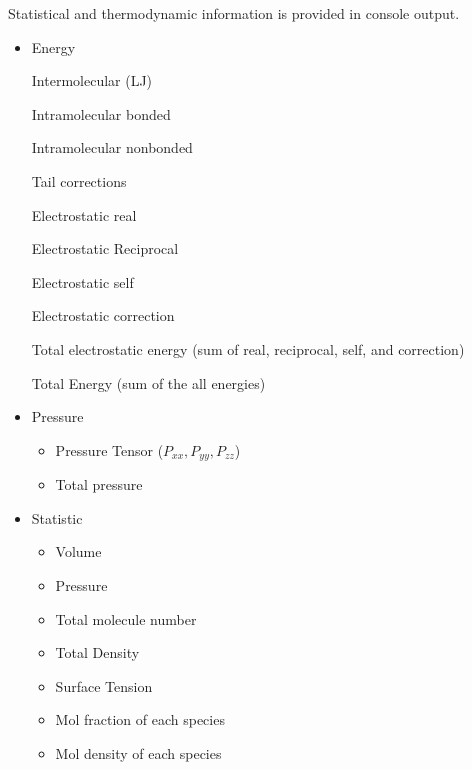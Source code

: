 \documentclass[letterpaper,10pt,english]{sphinxmanual}
\begin{document}
\sphinxAtStartPar
Statistical and thermodynamic information is provided in console output.
\begin{itemize}
\item {} 
\sphinxAtStartPar
Energy

\sphinxAtStartPar
\textendash{} Intermolecular (LJ)

\sphinxAtStartPar
\textendash{} Intramolecular bonded

\sphinxAtStartPar
\textendash{} Intramolecular nonbonded

\sphinxAtStartPar
\textendash{} Tail corrections

\sphinxAtStartPar
\textendash{} Electrostatic real

\sphinxAtStartPar
\textendash{} Electrostatic Reciprocal

\sphinxAtStartPar
\textendash{} Electrostatic self

\sphinxAtStartPar
\textendash{} Electrostatic correction

\sphinxAtStartPar
\textendash{} Total electrostatic energy (sum of real, reciprocal, self, and correction)

\sphinxAtStartPar
\textendash{} Total Energy (sum of the all energies)

\item {} 
\sphinxAtStartPar
Pressure
\begin{itemize}
\item {} 
\sphinxAtStartPar
Pressure Tensor (\(P_{xx},P_{yy},P_{zz}\))

\item {} 
\sphinxAtStartPar
Total pressure

\end{itemize}

\item {} 
\sphinxAtStartPar
Statistic
\begin{itemize}
\item {} 
\sphinxAtStartPar
Volume

\item {} 
\sphinxAtStartPar
Pressure

\item {} 
\sphinxAtStartPar
Total molecule number

\item {} 
\sphinxAtStartPar
Total Density

\item {} 
\sphinxAtStartPar
Surface Tension

\item {} 
\sphinxAtStartPar
Mol fraction of each species

\item {} 
\sphinxAtStartPar
Mol density of each species

\end{itemize}

\end{itemize}
\end{document}

